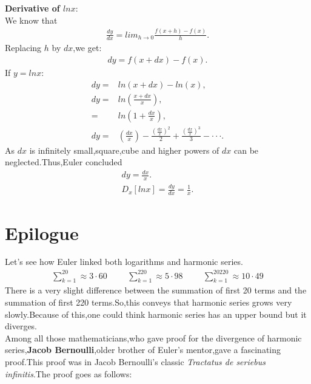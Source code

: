 \documentclass[a4paper,reqno,11pt]{book}
\theoremstyle{plain}%
\theoremstyle{definition}
\begin{document}
\noindent\textbf{Derivative of $lnx$}:\\
We know that 
\begin{eqnarray*}
    \frac{dy}{dx}=lim_{h\to 0}\frac{f(x+h)-f(x)}{h}.
\end{eqnarray*}
Replacing $h$ by $dx$,we get:
\begin{eqnarray*}
    dy=f(x+dx)-f(x).
\end{eqnarray*}
If $y=lnx$:
\begin{align*}
    dy=&ln(x+dx)-ln(x),\\
    dy=&ln\left(\frac{x+dx}{x}\right),\\
      =&ln\left(1+\frac{dx}{x}\right),\\
     dy=&\left(\frac{dx}{x}\right)-\frac{(\frac{dx}{x})^2}{2}+\frac{(\frac{dx}{x})^3}{3}-\cdot\cdot\cdot.
\end{align*}
\noindent As $dx$ is infinitely small,square,cube and higher powers of $dx$ can be neglected.Thus,Euler concluded
\begin{eqnarray*}
    dy=\frac{dx}{x}.\\
    D_{x}{[lnx]}=\frac{dy}{dx}=\frac{1}{x}.
\end{eqnarray*}
\section{Epilogue}
Let's see how Euler linked both logarithms and harmonic series.
\begin{eqnarray*}
\sum_{k=1}^{20}\approx3\cdot60\hspace{1cm}\sum_{k=1}^{220}\approx5\cdot98\hspace{1cm}\sum_{k=1}^{20220}\approx10\cdot49
\end{eqnarray*}
There is a very slight difference between the summation of first 20 terms and the summation of first 220 terms.So,this conveys that harmonic series grows very slowly.Because of this,one could think harmonic series has an upper bound but it diverges.\\
Among all those mathematicians,who gave proof for the divergence of harmonic series,\textbf{Jacob Bernoulli},older brother of Euler's mentor,gave a fascinating proof.This proof was in Jacob Bernoulli's classic \textit{Tractatus de seriebus infinitis}.The proof goes as follows:\\
\end{document}
